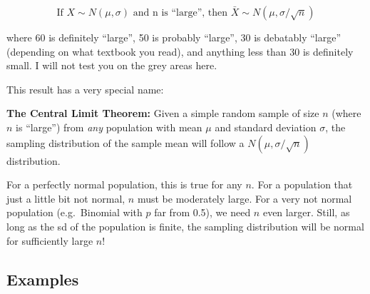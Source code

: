 \documentclass[
  letterpaper,
  DIV=11,
  numbers=noendperiod]{scrreprt}
\begin{document}
\[
\text{If }X\sim N(\mu, \sigma)\text{ and n is ``large'', then }\bar X\sim N(\mu,\sigma/\sqrt{n})
\]

where 60 is definitely ``large'', 50 is probably ``large'', 30 is
debatably ``large'' (depending on what textbook you read), and anything
less than 30 is definitely small. I will not test you on the grey areas
here.

This result has a very special name:

\textbf{The Central Limit Theorem:} Given a simple random sample of size
\(n\) (where \(n\) is ``large'') from \emph{any} population with mean
\(\mu\) and standard deviation \(\sigma\), the sampling distribution of
the sample mean will follow a \(N(\mu, \sigma/\sqrt{n})\) distribution.

For a perfectly normal population, this is true for any \(n\). For a
population that just a little bit not normal, \(n\) must be moderately
large. For a very not normal population (e.g.~Binomial with \(p\) far
from 0.5), we need \(n\) even larger. Still, as long as the sd of the
population is finite, the sampling distribution will be normal for
sufficiently large \(n\)!

\hypertarget{examples-4}{%
\subsection{Examples}\label{examples-4}}
\end{document}
